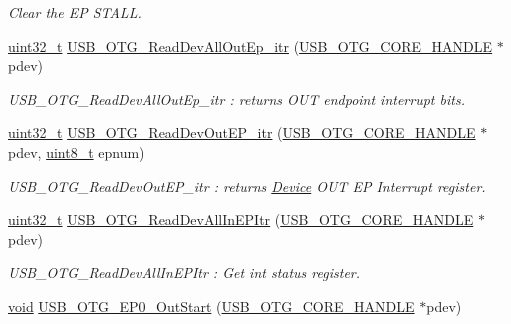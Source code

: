 \begin{DoxyCompactItemize}
\begin{DoxyCompactList}\small\item\em Clear the E\-P S\-T\-A\-L\-L. \end{DoxyCompactList}\item 
\hyperlink{stdint_8h_a435d1572bf3f880d55459d9805097f62}{uint32\-\_\-t} \hyperlink{group___u_s_b___c_o_r_e___private___functions_ga33dbdaa5715a5db6d0177ae772af4159}{U\-S\-B\-\_\-\-O\-T\-G\-\_\-\-Read\-Dev\-All\-Out\-Ep\-\_\-itr} (\hyperlink{group___u_s_b___c_o_r_e___exported___types_gaf76054c11eb8a3367907aad7ae700e80}{U\-S\-B\-\_\-\-O\-T\-G\-\_\-\-C\-O\-R\-E\-\_\-\-H\-A\-N\-D\-L\-E} $\ast$pdev)
\begin{DoxyCompactList}\small\item\em U\-S\-B\-\_\-\-O\-T\-G\-\_\-\-Read\-Dev\-All\-Out\-Ep\-\_\-itr \-: returns O\-U\-T endpoint interrupt bits. \end{DoxyCompactList}\item 
\hyperlink{stdint_8h_a435d1572bf3f880d55459d9805097f62}{uint32\-\_\-t} \hyperlink{group___u_s_b___c_o_r_e___private___functions_gab431fd0037edf4d5eb1c248dc3bd31d8}{U\-S\-B\-\_\-\-O\-T\-G\-\_\-\-Read\-Dev\-Out\-E\-P\-\_\-itr} (\hyperlink{group___u_s_b___c_o_r_e___exported___types_gaf76054c11eb8a3367907aad7ae700e80}{U\-S\-B\-\_\-\-O\-T\-G\-\_\-\-C\-O\-R\-E\-\_\-\-H\-A\-N\-D\-L\-E} $\ast$pdev, \hyperlink{stdint_8h_aba7bc1797add20fe3efdf37ced1182c5}{uint8\-\_\-t} epnum)
\begin{DoxyCompactList}\small\item\em U\-S\-B\-\_\-\-O\-T\-G\-\_\-\-Read\-Dev\-Out\-E\-P\-\_\-itr \-: returns \hyperlink{struct_device}{Device} O\-U\-T E\-P Interrupt register. \end{DoxyCompactList}\item 
\hyperlink{stdint_8h_a435d1572bf3f880d55459d9805097f62}{uint32\-\_\-t} \hyperlink{group___u_s_b___c_o_r_e___private___functions_ga53415c92edbfe07ff54c0e6f5241f8c9}{U\-S\-B\-\_\-\-O\-T\-G\-\_\-\-Read\-Dev\-All\-In\-E\-P\-Itr} (\hyperlink{group___u_s_b___c_o_r_e___exported___types_gaf76054c11eb8a3367907aad7ae700e80}{U\-S\-B\-\_\-\-O\-T\-G\-\_\-\-C\-O\-R\-E\-\_\-\-H\-A\-N\-D\-L\-E} $\ast$pdev)
\begin{DoxyCompactList}\small\item\em U\-S\-B\-\_\-\-O\-T\-G\-\_\-\-Read\-Dev\-All\-In\-E\-P\-Itr \-: Get int status register. \end{DoxyCompactList}\item 
\hyperlink{group___n_a_m_e_ga18028b8badbf1ea7e704ccac3c488e82}{void} \hyperlink{group___u_s_b___c_o_r_e___private___functions_gac6e350367b0ba6e54a333cb9bc964bfa}{U\-S\-B\-\_\-\-O\-T\-G\-\_\-\-E\-P0\-\_\-\-Out\-Start} (\hyperlink{group___u_s_b___c_o_r_e___exported___types_gaf76054c11eb8a3367907aad7ae700e80}{U\-S\-B\-\_\-\-O\-T\-G\-\_\-\-C\-O\-R\-E\-\_\-\-H\-A\-N\-D\-L\-E} $\ast$pdev)

\end{DoxyCompactItemize}
